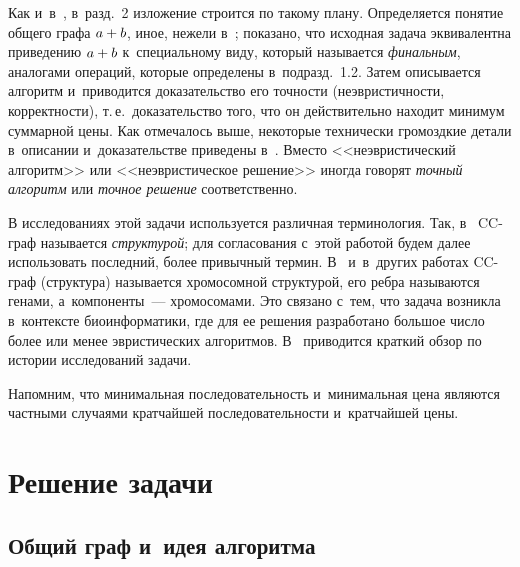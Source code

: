 \begin{multicols}{2}
  
  Как и~в~\cite{2-gor}, в~разд.~2 изложение строится по такому плану. 
Определяется понятие общего графа $a\hm+b$, иное, нежели  
в~\cite{4-gor, 5-gor}; показано, что исходная задача эквивалентна приведению 
$a\hm+b$ к~специальному виду, который называется \textit{финальным}, 
аналогами операций, которые определены в~подразд.~1.2. Затем описывается 
алгоритм и~приводится доказательство его точности (неэвристичности, 
корректности), т.\,е.\ доказательство того, что он действительно находит 
минимум суммарной цены. Как отмечалось выше, некоторые технически 
громоздкие детали в~описании и~доказательстве приведены в~\cite{1-gor}. 
Вместо <<неэвристический алгоритм>> или <<неэвристическое решение>> 
иногда говорят \textit{точный алгоритм} или \textit{точное решение} 
соответственно.

  
  В исследованиях этой задачи используется различная терминология. Так, 
в~\cite{2-gor} CC-граф называется \textit{структурой}; для согласования с~этой 
работой будем далее использовать последний, более привычный термин. 
В~\cite{3-gor} и~в~других работах CC-граф (структура) называется 
хромосомной структурой, его реб\-ра называются генами, а~компоненты~--- 
хромосомами. Это связано с~тем, что задача возникла в~контексте 
биоинформатики, где для ее решения разработано большое число более или 
менее эвристических алгоритмов. В~\cite{3-gor} приводится краткий обзор по 
истории исследований задачи. 

  
  Напомним, что минимальная последовательность и~минимальная цена 
являются частными случаями кратчайшей последовательности и~кратчайшей 
цены. 
  
  \section{Решение задачи }
  
  \subsection{Общий граф и~идея алгоритма}
  

\end{multicols}
